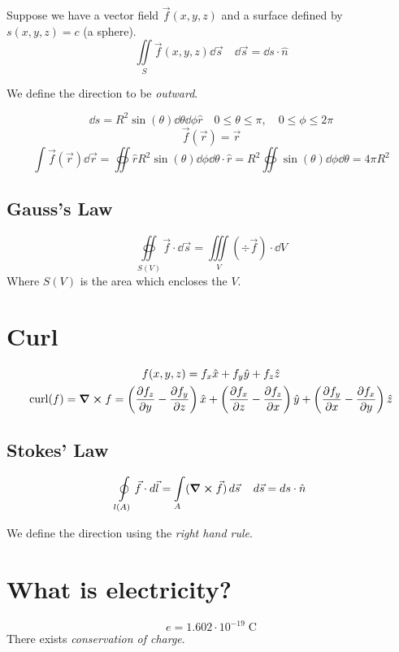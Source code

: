 \documentclass[00_complete]{subfiles}
\begin{document}
Suppose we have a vector field $\vec f (x,y,z)$ and a surface defined by
$s(x,y,z)=c$ (a sphere).
$$\iint\limits_S \vec f(x,y,z)\dd{\vec s} \quad \dd{\vec s}=\dd{s} \cdot \hat n$$
\begin{note}
    We define the direction to be \emph{outward}.
\end{note}
$$\dd{s}=R^2\sin(\theta)\dd{\theta}\dd{\phi}\hat r \quad 0 \leq \theta \leq
\pi, \quad 0 \leq \phi \leq 2\pi$$
$$\vec f (\vec r)=\vec r$$
$$\int \vec f (\vec r)\dd{\vec r} = \oiint \hat r R^2 \sin
(\theta)\dd{\phi}\dd{\theta}\cdot \hat r = R^2
\oiint\sin(\theta)\dd{\phi}\dd{\theta}= 4 \pi R^2$$
\subsection{Gauss's Law}
$$\oiint\limits_{S(V)}\vec f \cdot \dd{\vec s}= \iiint\limits_V(\div \vec
f) \cdot \dd{V}$$
Where $S(V)$ is the area which encloses the $V$.
\section{Curl}
\begin{gather*}
    f(x,y,z)=f_x\hat x + f_y \hat y + f_z\hat z \\
    \operatorname{curl}(f)=\curl f = \left(\pdv{f_z}{y}-\pdv{f_y}{z}\right)\hat x
    + \left(\pdv{f_x}{z}-\pdv{f_z}{x}\right)\hat y
    + \left(\pdv{f_y}{x}-\pdv{f_x}{y}\right)\hat z
\end{gather*}
\subsection{Stokes' Law}
$$\oint\limits_{l(A)}\vec f \cdot \dd{\vec l} = \int\limits_A(\curl \vec
f)\dd{\vec s} \quad \dd{\vec s}=\dd{s}\cdot \hat n$$
\begin{note}
    We define the direction using the \emph{right hand rule}.
\end{note}
\section{What is electricity?}
$$e=1.602\cdot 10^{-19}\;\mathrm{C}$$
There exists \emph{conservation of charge}.
\end{document}
